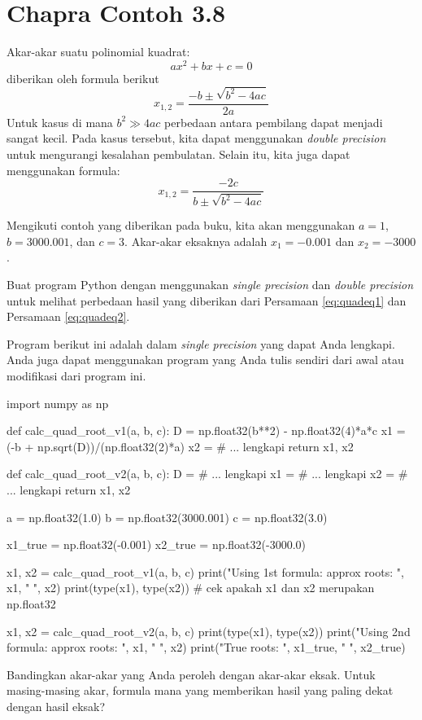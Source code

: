 \section{Chapra Contoh 3.8}
Akar-akar suatu polinomial kuadrat:
\begin{equation*}
ax^2 + bx + c = 0
\end{equation*}
diberikan oleh formula berikut
\begin{equation}
x_{1,2} = \frac{-b \pm \sqrt{b^2 - 4ac}}{2a}
\label{eq:quadeq1}
\end{equation}
Untuk kasus di mana $b^2 \gg 4ac$ perbedaan antara pembilang dapat menjadi sangat kecil.
Pada kasus tersebut, kita dapat menggunakan \textit{double precision} untuk mengurangi
kesalahan pembulatan. Selain itu, kita juga dapat menggunakan formula:
\begin{equation}
x_{1,2} = \frac{-2c}{b \pm \sqrt{b^2 - 4ac}}
\label{eq:quadeq2}
\end{equation}

Mengikuti contoh yang diberikan pada buku, kita akan menggunakan
$a = 1$, $b = 3000.001$, dan $c = 3$. Akar-akar eksaknya adalah
$x_{1} = -0.001$ dan $x_2 = -3000$.

\begin{soal}
Buat program Python dengan menggunakan \textit{single precision} dan
\textit{double precision} untuk melihat perbedaan hasil yang diberikan 
dari Persamaan \eqref{eq:quadeq1} dan Persamaan \eqref{eq:quadeq2}.

Program berikut ini adalah dalam \textit{single precision}
yang dapat Anda lengkapi. Anda juga dapat menggunakan program yang Anda tulis sendiri
dari awal atau modifikasi dari program ini.
\begin{pythoncode}
import numpy as np

def calc_quad_root_v1(a, b, c):
  D = np.float32(b**2) - np.float32(4)*a*c
  x1 = (-b + np.sqrt(D))/(np.float32(2)*a)
  x2 = # ... lengkapi
  return x1, x2
  
def calc_quad_root_v2(a, b, c):
  D = # ... lengkapi
  x1 = # ... lengkapi
  x2 = # ... lengkapi
  return x1, x2
  
a = np.float32(1.0)
b = np.float32(3000.001)
c = np.float32(3.0)
  
x1_true = np.float32(-0.001)
x2_true = np.float32(-3000.0)
  
x1, x2 = calc_quad_root_v1(a, b, c)
print("Using 1st formula: approx roots: ", x1, " ", x2)
print(type(x1), type(x2)) # cek apakah x1 dan x2 merupakan np.float32
  
x1, x2 = calc_quad_root_v2(a, b, c)
print(type(x1), type(x2))
print("Using 2nd formula: approx roots: ", x1, " ", x2)  
print("True roots: ", x1_true, " ", x2_true)
\end{pythoncode}

Bandingkan akar-akar yang Anda peroleh dengan akar-akar eksak.
Untuk masing-masing akar, formula mana yang memberikan hasil yang paling dekat dengan
hasil eksak?
\end{soal}

